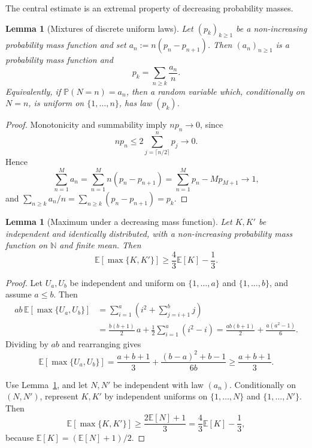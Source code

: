 \documentclass[11pt,a4paper]{amsart}
\newtheorem{lemma}[theorem]{Lemma}
\theoremstyle{remark}
\newcommand{\N}{\mathbb N}
\begin{document}
The central estimate is an extremal property of decreasing probability
masses.

\begin{lemma}[Mixtures of discrete uniform laws]
\label{lem:uniform-mixture}
Let \((p_k)_{k\geq1}\) be a non-increasing probability mass function and
set \(a_n:=n(p_n-p_{n+1})\). Then \((a_n)_{n\geq1}\) is a probability mass
function and
\begin{equation}
\label{eq:uniform-mixture}
        p_k=\sum_{n\geq k}\frac{a_n}{n}.
\end{equation}
Equivalently, if \(\mathbb{P}(N=n)=a_n\), then a random variable which,
conditionally on \(N=n\), is uniform on \(\{1,\ldots,n\}\), has law
\((p_k)\).
\end{lemma}

\begin{proof}
Monotonicity and summability imply \(np_n\to0\), since
\[
        np_n\leq2\sum_{j=\lceil n/2\rceil}^{n}p_j\longrightarrow0.
\]
Hence
\[
        \sum_{n=1}^Ma_n
        =
        \sum_{n=1}^Mn(p_n-p_{n+1})
        =
        \sum_{n=1}^Mp_n-Mp_{M+1}\longrightarrow1,
\]
and \(\sum_{n\geq k}a_n/n=\sum_{n\geq k}(p_n-p_{n+1})=p_k\).
\end{proof}

\begin{lemma}[Maximum under a decreasing mass function]
\label{lem:decreasing-mass}
Let \(K,K'\) be independent and identically distributed, with a non-increasing probability mass
function on \(\N\) and finite mean. Then
\begin{equation}
\label{eq:decreasing-max}
        \mathbb{E}[\max\{K,K'\}]
        \geq
        \frac43\mathbb{E}[K]-\frac13.
\end{equation}
\end{lemma}

\begin{proof}
Let \(U_a,U_b\) be independent and uniform on \(\{1,\ldots,a\}\) and
\(\{1,\ldots,b\}\), and assume \(a\leq b\). 
Then
\[
\begin{aligned}
ab\,\mathbb{E}[\max\{U_a,U_b\}]
&=\sum_{i=1}^a\left(i^2+\sum_{j=i+1}^b j\right) \\
&=\frac{b(b+1)}2\,a
  +\frac12\sum_{i=1}^a(i^2-i)
 =\frac{ab(b+1)}2+\frac{a(a^2-1)}6.
\end{aligned}
\]
Dividing by \(ab\) and rearranging gives
\[
        \mathbb{E}[\max\{U_a,U_b\}]
        =
        \frac{a+b+1}{3}
        +
        \frac{(b-a)^2+b-1}{6b} \geq\frac{a+b+1}{3} .
\]


Use Lemma~\ref{lem:uniform-mixture}, and let \(N,N'\) be independent with
law \((a_n)\). Conditionally on \((N,N')\), represent \(K,K'\) by
independent uniforms on \(\{1,\ldots,N\}\) and
\(\{1,\ldots,N'\}\). Then
\[
        \mathbb{E}[\max\{K,K'\}]
        \geq\frac{2\mathbb{E}[N]+1}{3}
        =
        \frac43\mathbb{E}[K]-\frac13,
\]
because \(\mathbb{E}[K]=(\mathbb{E}[N]+1)/2\).
\end{proof}
\end{document}
